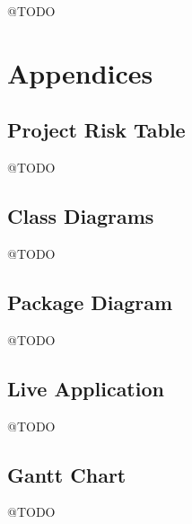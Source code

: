 \documentclass[11pt]{article}
\begin{document}

@TODO



\newpage

\section{Appendices} %

\subsection{Project Risk Table}
@TODO
\subsection{Class Diagrams}
@TODO
\subsection{Package Diagram}
@TODO
\subsection{Live Application}
@TODO
\subsection{Gantt Chart}
@TODO
\end{document}
